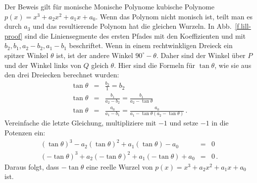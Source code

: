 Der Beweis gilt für monische {Monische Polynome} kubische Polynome $p(x)=x^3+a_2x^2+a_1x+a_0$. Wenn das Polynom nicht monisch ist, teilt man es durch $a_3$ und das resultierende Polynom hat die gleichen Wurzeln. In Abb.~\ref{f.lill-proof} sind die Liniensegmente des ersten Pfades mit den Koeffizienten und mit $b_2,b_1,a_2-b_2,a_1-b_1$ beschriftet. Wenn in einem rechtwinkligen Dreieck ein spitzer Winkel $\theta$ ist, ist der andere Winkel $90^\circ-\theta$. Daher sind der Winkel über $P$ und der Winkel links von $Q$ gleich $\theta$. Hier sind die Formeln für $\tan \theta$, wie sie aus den drei Dreiecken berechnet wurden:
\begin{eqnarray*}
\tan \theta &=& \frac{b_2}{1}=b_2\\
\tan \theta &=& \frac{b_1}{a_2-b_2}=\frac{b_1}{a_2-\tan\theta}\\
\tan \theta &=& \frac{a_0}{a_1-b_1}=\frac{a_0}{a_1-\tan\theta(a_2-\tan\theta)}\,.
\end{eqnarray*}
Vereinfache die letzte Gleichung, multipliziere mit $-1$ und setze $-1$ in die Potenzen ein:
\begin{eqnarray*}
(\tan\theta)^3-a_2(\tan\theta)^2+a_1(\tan\theta)-a_0&=&0\\
(-\tan\theta)^3+a_2(-\tan\theta)^2+a_1(-\tan\theta)+a_0&=&0\,.
\end{eqnarray*}
Daraus folgt, dass $-\tan\theta$ eine reelle Wurzel von $p(x)=x^3+a_2x^2+a_1x+a_0$ ist.

